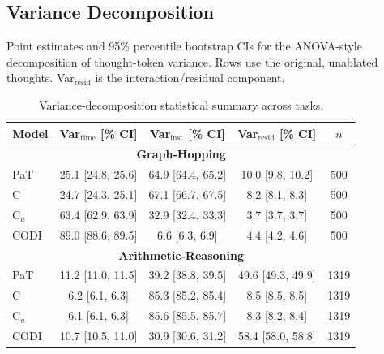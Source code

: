 \subsection{Variance Decomposition}
\label{app:variance_decomposition_stats}

Point estimates and 95\% percentile bootstrap CIs for the ANOVA-style decomposition of thought-token variance. Rows use the original, unablated thoughts. Var$_\text{resid}$ is the interaction/residual component.

\begin{table}[h!]
\centering
\small
\setlength{\tabcolsep}{4pt}
\caption{Variance-decomposition statistical summary across tasks.}
\begin{tabular}{l ccc c}
\toprule
Model & Var$_\text{time}$ [\% CI] & Var$_\text{inst}$ [\% CI] & Var$_\text{resid}$ [\% CI] & $n$ \\
\midrule
\multicolumn{5}{c}{\textbf{Graph-Hopping}} \\
\midrule
PaT & 25.1 [24.8, 25.6] & 64.9 [64.4, 65.2] & 10.0 [9.8, 10.2] & 500 \\
C & 24.7 [24.3, 25.1] & 67.1 [66.7, 67.5] & 8.2 [8.1, 8.3] & 500 \\
C$_u$ & 63.4 [62.9, 63.9] & 32.9 [32.4, 33.3] & 3.7 [3.7, 3.7] & 500 \\
CODI & 89.0 [88.6, 89.5] & 6.6 [6.3, 6.9] & 4.4 [4.2, 4.6] & 500 \\
\midrule
\multicolumn{5}{c}{\textbf{Arithmetic-Reasoning}} \\
\midrule
PaT & 11.2 [11.0, 11.5] & 39.2 [38.8, 39.5] & 49.6 [49.3, 49.9] & 1319 \\
C & 6.2 [6.1, 6.3] & 85.3 [85.2, 85.4] & 8.5 [8.5, 8.5] & 1319 \\
C$_u$ & 6.1 [6.1, 6.3] & 85.6 [85.5, 85.7] & 8.3 [8.2, 8.4] & 1319 \\
CODI & 10.7 [10.5, 11.0] & 30.9 [30.6, 31.2] & 58.4 [58.0, 58.8] & 1319 \\
\bottomrule
\end{tabular}
\label{tab:variance_decomposition_stats_combined}
\end{table}